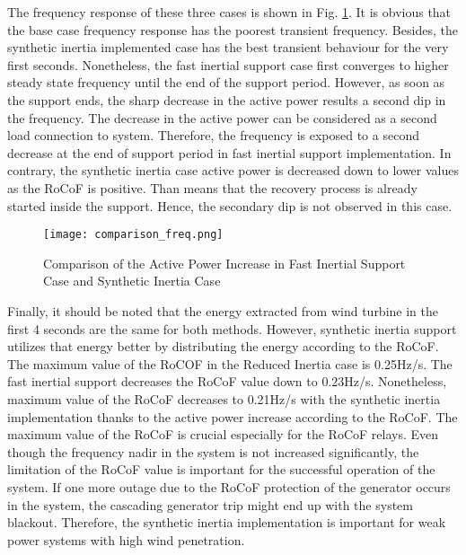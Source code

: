 The frequency response of these three cases is shown in Fig. \ref{Comp_freq}. It is obvious that the base case frequency response has the poorest transient frequency. Besides, the synthetic inertia implemented case has the best transient behaviour for the very first seconds. Nonetheless, the fast inertial support case first converges to higher steady state frequency until the end of the support period. However, as soon as the support ends, the sharp decrease in the active power results a second dip in the frequency. The decrease in the active power can be considered as a second load connection to system. Therefore, the frequency is exposed to a second decrease at the end of support period in fast inertial support implementation. In contrary, the synthetic inertia case active power is decreased down to lower values as the RoCoF is positive. Than means that the recovery process is already started inside the support. Hence, the secondary dip is not observed in this case. \par
\begin{figure}[h!]
	\centering
	\texttt{[image: comparison\_freq.png]}
	\caption{Comparison of the Active Power Increase in Fast Inertial Support Case and Synthetic Inertia Case}
	\label{Comp_freq}
\end{figure}
Finally, it should be noted that the energy extracted from wind turbine in the first 4 seconds are the same for both methods. However, synthetic inertia support utilizes that energy better by distributing the energy according to the RoCoF. The maximum value of the RoCOF in the Reduced Inertia case is 0.25Hz/s. The fast inertial support decreases the RoCoF value down to 0.23Hz/s. Nonetheless, maximum value of the RoCoF decreases to 0.21Hz/s with the synthetic inertia implementation thanks to the active power increase according to the RoCoF. The maximum value of the RoCoF is crucial especially for the RoCoF relays. Even though the frequency nadir in the system is not increased significantly, the limitation of the RoCoF value is important for the successful operation of the system. If one more outage due to the RoCoF protection of the generator occurs in the system, the cascading generator trip might end up with the system blackout. Therefore, the synthetic inertia implementation is important for weak power systems with high wind penetration.
